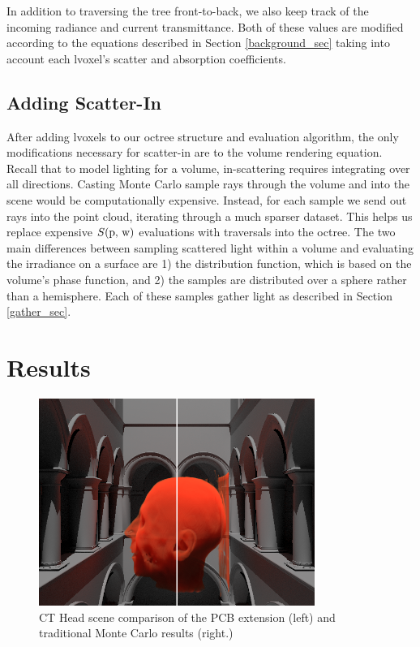 \documentclass[runningheads]{llncs}
\begin{document}
In addition to traversing the tree front-to-back, we also keep track of the incoming radiance and current transmittance.  Both of these values are modified according to the equations described in Section \ref{background_sec} taking into account each lvoxel's scatter and absorption coefficients.


\subsection{Adding Scatter-In}
\label{scatterin_sec}
After adding lvoxels to our octree structure and evaluation algorithm, the only modifications necessary for scatter-in are to the volume rendering equation.  Recall that to model lighting for a volume, in-scattering requires integrating over all directions.  Casting Monte Carlo sample rays through the volume and into the scene would be computationally expensive.  Instead, for each sample we send out rays into the point cloud, iterating through a much sparser dataset.  This helps us replace expensive $S(\textup{p, w})$ evaluations with traversals into the octree.  The two main differences between sampling scattered light within a volume and evaluating the irradiance on a surface are 1) the distribution function, which is based on the volume's phase function, and 2) the samples are distributed over a sphere rather than a hemisphere.  Each of these samples gather light as described in Section \ref{gather_sec}.


\section{Results}

\begin{figure}
    \centering
    \includegraphics[width=90mm]{img/compare_head.png}
    \caption{CT Head scene comparison of the PCB extension (left) and traditional Monte Carlo results (right.)}
    \label{fig:compare2}
\end{figure}
\end{document}
